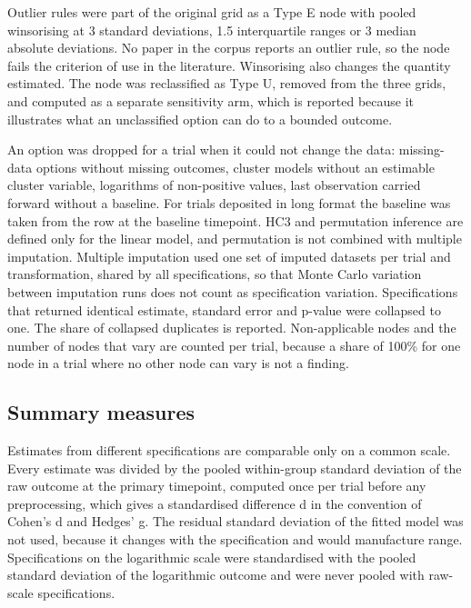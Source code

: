 Outlier rules were part of the original grid as a Type E node with pooled winsorising at 3 standard deviations, 1.5 interquartile ranges or 3 median absolute deviations. No paper in the corpus reports an outlier rule, so the node fails the criterion of use in the literature. Winsorising also changes the quantity estimated. The node was reclassified as Type U, removed from the three grids, and computed as a separate sensitivity arm, which is reported because it illustrates what an unclassified option can do to a bounded outcome.

An option was dropped for a trial when it could not change the data: missing-data options without missing outcomes, cluster models without an estimable cluster variable, logarithms of non-positive values, last observation carried forward without a baseline. For trials deposited in long format the baseline was taken from the row at the baseline timepoint. HC3 and permutation inference are defined only for the linear model, and permutation is not combined with multiple imputation. Multiple imputation used one set of imputed datasets per trial and transformation, shared by all specifications, so that Monte Carlo variation between imputation runs does not count as specification variation. Specifications that returned identical estimate, standard error and p-value were collapsed to one. The share of collapsed duplicates is reported. Non-applicable nodes and the number of nodes that vary are counted per trial, because a share of 100\% for one node in a trial where no other node can vary is not a finding.

\subsection{Summary measures}\label{summary-measures}

Estimates from different specifications are comparable only on a common scale. Every estimate was divided by the pooled within-group standard deviation of the raw outcome at the primary timepoint, computed once per trial before any preprocessing, which gives a standardised difference d in the convention of Cohen's d and Hedges' g. The residual standard deviation of the fitted model was not used, because it changes with the specification and would manufacture range. Specifications on the logarithmic scale were standardised with the pooled standard deviation of the logarithmic outcome and were never pooled with raw-scale specifications.

